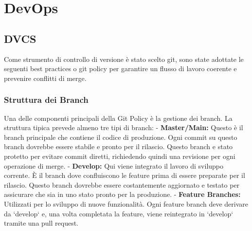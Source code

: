 \chapter{DevOps}
\label{ch:DevOps} %
\section{DVCS}

Come strumento di controllo di versione è stato scelto git, sono state adottate le seguenti best practices o git policy per garantire un flusso di lavoro coerente e prevenire conflitti di merge.

\subsection{Struttura dei Branch}

Una delle componenti principali della Git Policy è la gestione dei branch. La struttura tipica prevede almeno tre tipi di branch:
- \textbf{Master/Main:} Questo è il branch principale che contiene il codice di produzione. Ogni commit su questo branch dovrebbe essere stabile e pronto per il rilascio. Questo branch e stato protetto per evitare commit diretti, richiedendo quindi una revisione per ogni operazione di merge.
- \textbf{Develop:} Qui viene integrato il lavoro di sviluppo corrente. È il branch dove confluiscono le feature prima di essere preparate per il rilascio. Questo branch dovrebbe essere costantemente aggiornato e testato per assicurare che sia in uno stato pronto per la produzione.
- \textbf{Feature Branches:} Utilizzati per lo sviluppo di nuove funzionalità. Ogni feature branch deve derivare da `develop` e, una volta completata la feature, viene reintegrato in `develop` tramite una pull request.




